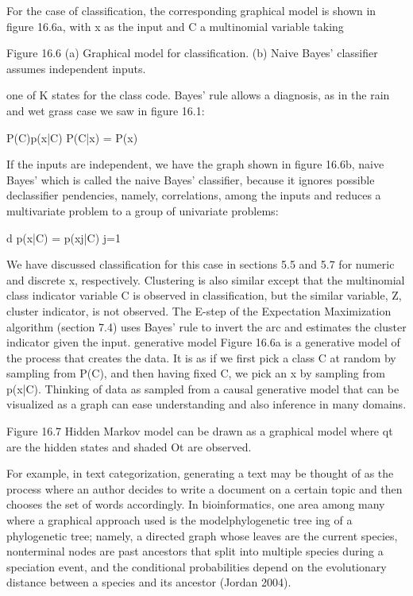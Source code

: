 For the case of classification, the corresponding graphical model is shown in figure 16.6a, with x as the input and C a multinomial variable taking

Figure 16.6 (a) Graphical model for classification. (b) Naive Bayes’ classifier assumes independent inputs.

one of K states for the class code. Bayes’ rule allows a diagnosis, as in the rain and wet grass case we saw in figure 16.1:

P(C)p(x|C) P(C|x) = P(x)

If the inputs are independent, we have the graph shown in figure 16.6b, naive Bayes’ which is called the naive Bayes’ classifier, because it ignores possible declassifier pendencies, namely, correlations, among the inputs and reduces a multivariate problem to a group of univariate problems:

d p(x|C) = p(xj|C) j=1

We have discussed classification for this case in sections 5.5 and 5.7 for numeric and discrete x, respectively. Clustering is also similar except that the multinomial class indicator variable C is observed in classification, but the similar variable, Z, cluster indicator, is not observed. The E-step of the Expectation Maximization algorithm (section 7.4) uses Bayes’ rule to invert the arc and estimates the cluster indicator given the input. generative model Figure 16.6a is a generative model of the process that creates the data. It is as if we first pick a class C at random by sampling from P(C), and then having fixed C, we pick an x by sampling from p(x|C). Thinking of data as sampled from a causal generative model that can be visualized as a graph can ease understanding and also inference in many domains.

Figure 16.7 Hidden Markov model can be drawn as a graphical model where qt are the hidden states and shaded Ot are observed.

For example, in text categorization, generating a text may be thought of as the process where an author decides to write a document on a certain topic and then chooses the set of words accordingly. In bioinformatics, one area among many where a graphical approach used is the modelphylogenetic tree ing of a phylogenetic tree; namely, a directed graph whose leaves are the current species, nonterminal nodes are past ancestors that split into multiple species during a speciation event, and the conditional probabilities depend on the evolutionary distance between a species and its ancestor (Jordan 2004).

